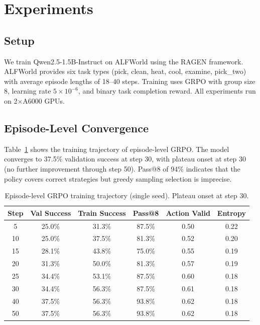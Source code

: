 \documentclass[11pt]{article}
\begin{document}
\section{Experiments}
\label{sec:experiments}

\subsection{Setup}

We train Qwen2.5-1.5B-Instruct on ALFWorld using the RAGEN framework. ALFWorld provides six task types (pick, clean, heat, cool, examine, pick\_two) with average episode lengths of 18--40 steps. Training uses GRPO with group size 8, learning rate $5 \times 10^{-6}$, and binary task completion reward. All experiments run on 2$\times$A6000 GPUs.

\subsection{Episode-Level Convergence}
\label{sec:convergence}

Table~\ref{tab:convergence} shows the training trajectory of episode-level GRPO. The model converges to 37.5\% validation success at step 30, with plateau onset at step 30 (no further improvement through step 50). Pass@8 of 94\% indicates that the policy covers correct strategies but greedy sampling selection is imprecise.

\begin{table}[h]
\centering
\caption{Episode-level GRPO training trajectory (single seed). Plateau onset at step 30.}
\label{tab:convergence}
\begin{tabular}{cccccc}
\toprule
Step & Val Success & Train Success & Pass@8 & Action Valid & Entropy \\
\midrule
5 & 25.0\% & 31.3\% & 87.5\% & 0.50 & 0.22 \\
10 & 25.0\% & 37.5\% & 81.3\% & 0.52 & 0.20 \\
15 & 28.1\% & 43.8\% & 75.0\% & 0.55 & 0.19 \\
20 & 31.3\% & 50.0\% & 81.3\% & 0.57 & 0.19 \\
25 & 34.4\% & 53.1\% & 87.5\% & 0.60 & 0.18 \\
30 & 34.4\% & 56.3\% & 87.5\% & 0.61 & 0.18 \\
40 & 37.5\% & 56.3\% & 93.8\% & 0.62 & 0.18 \\
50 & 37.5\% & 56.3\% & 93.8\% & 0.62 & 0.18 \\
\bottomrule
\end{tabular}
\end{table}
\end{document}
